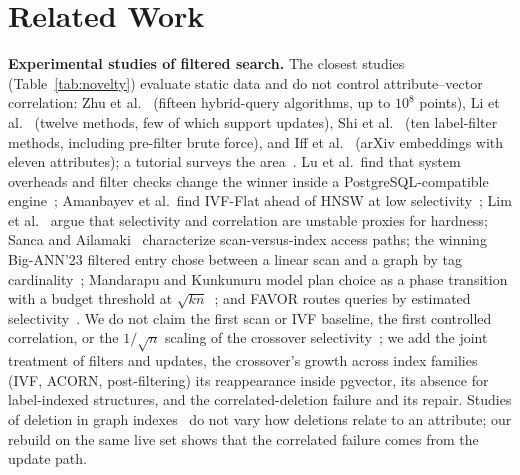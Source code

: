 \documentclass[conference]{IEEEtran}
\begin{document}
\section{Related Work}\label{sec:related}
\textbf{Experimental studies of filtered search.} The closest studies (Table~\ref{tab:novelty}) evaluate static data and do not control attribute--vector correlation: Zhu et al.~\cite{zhu2025hybrid} (fifteen hybrid-query algorithms, up to $10^8$ points), Li et al.~\cite{li2025attr} (twelve methods, few of which support updates), Shi et al.~\cite{shi2025fanns} (ten label-filter methods, including pre-filter brute force), and Iff et al.~\cite{iff2026fanns} (arXiv embeddings with eleven attributes); a tutorial surveys the area~\cite{chronis2025}. Lu et al.\ find that system overheads and filter checks change the winner inside a PostgreSQL-compatible engine~\cite{lu2026pg}; Amanbayev et al.\ find IVF-Flat ahead of HNSW at low selectivity~\cite{amanbayev2026}; Lim et al.~\cite{lim2026hcb} argue that selectivity and correlation are unstable proxies for hardness; Sanca and Ailamaki~\cite{sanca2024} characterize scan-versus-index access paths; the winning Big-ANN'23 filtered entry chose between a linear scan and a graph by tag cardinality~\cite{bigann23}; Mandarapu and Kunkunuru model plan choice as a phase transition with a budget threshold at $\sqrt{kn}$~\cite{mandarapu2026}; and FAVOR routes queries by estimated selectivity~\cite{favor}. We do not claim the first scan or IVF baseline, the first controlled correlation, or the $1/\sqrt n$ scaling of the crossover selectivity~\cite{mandarapu2026}; we add the joint treatment of filters and updates, the crossover's growth across index families (IVF, ACORN, post-filtering) its reappearance inside pgvector, its absence for label-indexed structures, and the correlated-deletion failure and its repair. Studies of deletion in graph indexes~\cite{xiao2024,yamashita2025} do not vary how deletions relate to an attribute; our rebuild on the same live set shows that the correlated failure comes from the update path.
\end{document}
